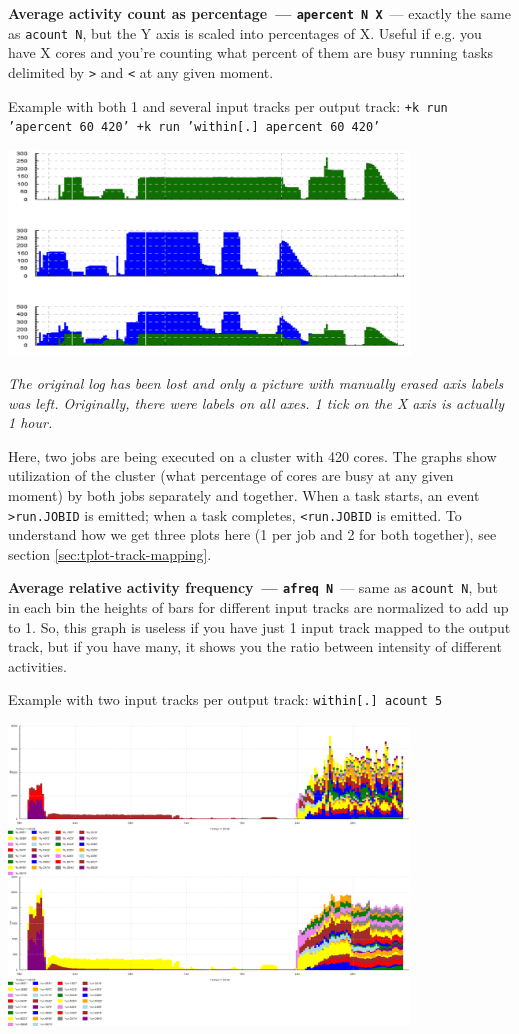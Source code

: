 \documentclass{article}
\begin{document}
\pagebreak
\noindent
\textbf{Average activity count as percentage~--- \texttt{apercent N X}}~--- exactly the same as \texttt{acount N}, but the Y axis is scaled into percentages of X. Useful if e.g. you have X cores and you're counting what percent of them are busy running tasks delimited by \texttt{>} and \texttt{<} at any given moment.

Example with both 1 and several input tracks per output track: \texttt{+k run 'apercent 60 420' +k run 'within[.] apercent 60 420'}

{\centering \includegraphics[width=0.8\textwidth]{pics/tplot/tplot-two-different-jobs-parallelization.png}}

\emph{The original log has been lost and only a picture with manually erased axis labels was left. Originally, there were labels on all axes. 1 tick on the X axis is actually 1 hour.}

Here, two jobs are being executed on a cluster with 420 cores. The graphs show utilization of the cluster (what percentage of cores are busy at any given moment) by both jobs separately and together. When a task starts, an event \texttt{>run.JOBID} is emitted; when a task completes, \texttt{<run.JOBID} is emitted. To understand how we get three plots here (1 per job and 2 for both together), see section \ref{sec:tplot-track-mapping}.

\pagebreak
\noindent
\textbf{Average relative activity frequency~--- \texttt{afreq N}}~--- same as \texttt{acount N}, but in each bin the heights of bars for different input tracks are normalized to add up to 1. So, this graph is useless if you have just 1 input track mapped to the output track, but if you have many, it shows you the ratio between intensity of different activities.

Example with two input tracks per output track: \texttt{within[.] acount 5}

{\centering \includegraphics[width=0.8\textwidth]{pics/tplot/acount-fly-run-manyjobs.png}}
\end{document}
